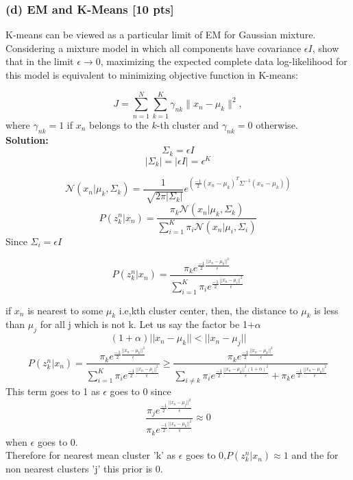 \documentclass[twoside,10pt]{article}
\begin{document}
\subsubsection*{(d) EM and K-Means [10 pts]}
K-means can be viewed as a particular limit of EM for Gaussian
mixture. Considering a mixture model in which all components have
covariance $\epsilon I$, show that in the limit $\epsilon\to 0$,
maximizing the expected complete data log-likelihood for this model
is equivalent to minimizing objective function in K-means:

\begin{equation}
J = \sum_{n=1}^N\sum_{k=1}^K\gamma_{nk}\|x_n-\mu_k\|^2,\nonumber
\end{equation}
where $\gamma_{nk} = 1$ if $x_n$ belongs to the $k$-th cluster and $\gamma_{nk} = 0$ otherwise.
\\
\textbf{ Solution: }\\

$$
\Sigma_k = \epsilon I
$$
$$
|\Sigma_k | = |\epsilon I| = \epsilon ^ K
$$

$$
\mathcal{N}{(x_n|\mu_k,\Sigma_k)} = \frac{1}{\sqrt[]{2\pi|\Sigma_k|} } e^{(\frac{-1}{2} (x_n-\mu_k)^T \Sigma^{-1} (x_n-\mu_k) )}
$$
$$
P(z_k^n|x_n) = \frac{\pi_k  \mathcal{N}{(x_n|\mu_k,\Sigma_k)}} {\sum_{i=1}^{K}{\pi_i  \mathcal{N}{(x_n|\mu_i,\Sigma_i)} } }
$$
Since $\Sigma_i = \epsilon I$

$$
P(z_k^n|x_n) = \frac{\pi_k e^{\frac{-1}{2}\frac{||x_n-\mu_k||^2}{\epsilon}}}{ \sum_{i=1}^{K}{\pi_i e^{\frac{-1}{2}\frac{||x_n-\mu_i||^2}{\epsilon}}} }
$$

if $x_n$ is nearest to some $\mu_k$ i.e,kth cluster center, then, the distance to $\mu_k$ is less than $\mu_j$ for all j which is not k. Let us say the factor be 1+$\alpha$
$$
(1+\alpha) ||x_n-\mu_k|| < ||x_n-\mu_j|| 
$$
$$
P(z_k^n|x_n) = \frac{\pi_k e^{\frac{-1}{2}\frac{||x_n-\mu_k||^2}{\epsilon}}}{ \sum_{i=1}^{K}{\pi_i e^{\frac{-1}{2}\frac{||x_n-\mu_i||^2}{\epsilon}}} } 
\geq 
\frac{\pi_k e^{\frac{-1}{2}\frac{||x_n-\mu_k||^2}{\epsilon}}}{ \sum_{i \neq k}^{ }{\pi_i e^{\frac{-1}{2}\frac{||x_n-\mu_k||^2(1+\alpha)^2}{\epsilon}}} + \pi_k e^{\frac{-1}{2}\frac{||x_n-\mu_k||^2}{\epsilon}} }
$$
This term goes to 1 as $\epsilon$ goes to 0 since
$$
\frac{ \pi_j e^{\frac{-1}{2}\frac{||x_n-\mu_j||^2}{\epsilon}} }{\pi_k e^{\frac{-1}{2}\frac{||x_n-\mu_k||^2}{\epsilon}}} \approx 0
$$ 
when $\epsilon$ goes to 0.
\\
Therefore for nearest mean cluster 'k' as $\epsilon$ goes to 0,$ P(z_k^n|x_n) \approx 1 $ and the for non nearest clusters 'j' this prior is 0.
\end{document}
